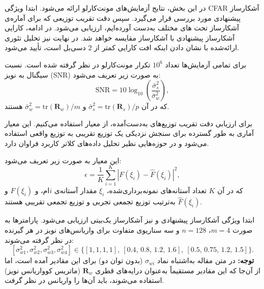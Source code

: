 
در این بخش، نتایج آزمایش‌های مونت‌کارلو ارائه می‌شود.  
ابتدا ویژگی CFAR آشکارساز پیشنهادی مورد بررسی قرار می‌گیرد.  
سپس دقت تقریب توزیعی که برای آماره‌ی آشکارساز تحت های مختلف به‌دست آورده‌ایم، ارزیابی می‌شود.  
در ادامه، کارایی آشکارساز پیشنهادی با آشکارساز  مقایسه خواهد شد.  
در نهایت نیز تحلیل تئوری ارائه‌شده با نشان دادن اینکه افت کارایی کمتر از $2$ دسی‌بل است، تأیید می‌شود.  

برای تمامی آزمایش‌ها تعداد $10^{6}$ تکرار مونت‌کارلو در نظر گرفته شده است.  
نسبت سیگنال به نویز (SNR) به صورت زیر تعریف می‌شود:
\begin{equation}
	\mathrm{SNR} = 10\log_{10}\!\left(\frac{\bar{\sigma}_{s}^{2}}{\bar{\sigma}_{w}^{2}}\right),
\end{equation}
که در آن $\bar{\sigma}_{s}^{2}=\mathrm{tr}(\mathbf{R}_{s})/p$ و 
$\bar{\sigma}_{w}^{2}=\mathrm{tr}(\mathbf{R}_{w})/m$ هستند.  

\medskip
برای ارزیابی دقت تقریب توزیع‌های به‌دست‌آمده، از معیار  استفاده می‌کنیم.  
این معیار آماری به طور گسترده برای سنجش نزدیکی یک توزیع تقریبی به توزیع واقعی استفاده می‌شود و در حوزه‌هایی نظیر تحلیل داده‌های کلاتر کاربرد فراوان دارد.  

این معیار به صورت زیر تعریف می‌شود:
\begin{equation}
	\epsilon = \frac{1}{K}\sum_{i=1}^{K}\left| F(\xi_{i}) - \hat F(\xi_{i}) \right|^{2},
\end{equation}
که در آن $K$ تعداد آستانه‌های نمونه‌برداری‌شده، $\xi_{i}$ مقدار آستانه‌ی $i$ام، و 
$F(\xi_{i})$ و $\hat F(\xi_{i})$ به‌ترتیب توزیع تجمعی تجربی و توزیع تجمعی تقریبی هستند.  


ابتدا ویژگی  آشکارساز پیشنهادی و نیز آشکارساز  یک‌بیتی ارزیابی می‌شود. 
پارامترها به صورت $m=4$، $n=128$ و سه سناریوی متفاوت برای واریانس‌های نویز در هر گیرنده در نظر گرفته می‌شوند:
\[
[\sigma_{w1}^{2},\sigma_{w2}^{2},\sigma_{w3}^{2},\sigma_{w4}^{2}]
\in \big\{[1,1,1,1],~[0.4,\,0.8,\,1.2,\,1.6],~[0.5,\,0.75,\,1.2,\,1.5]\big\}.
\]
\textbf{توجه:} در متن مقاله به‌اشتباه نماد $\sigma_{wi}$ (بدون توان دو) برای این مقادیر آمده است، 
اما از آن‌جا که این مقادیر مستقیماً به‌عنوان درایه‌های قطری $\mathbf{R}_{w}$ (ماتریس کوواریانس نویز) استفاده می‌شوند، 
باید آن‌ها را واریانس در نظر گرفت. 

